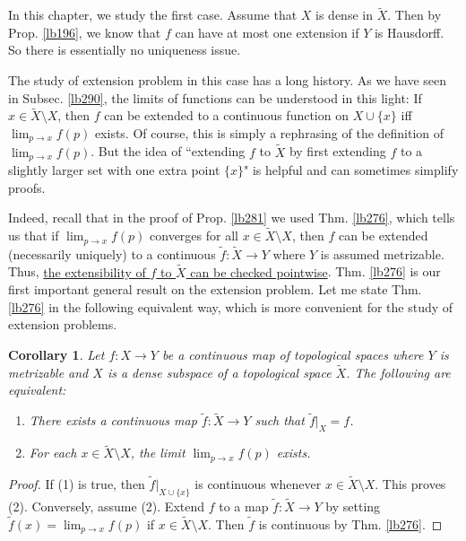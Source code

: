 \documentclass[12pt,b5paper,notitlepage]{article}
\theoremstyle{definition}
\theoremstyle{plain}
\newtheorem{co}[df]{Corollary}
\newcommand{\wtd}{\widetilde}
\numberwithin{equation}{section}
\begin{document}
In this chapter, we study the first case. Assume that $X$ is dense in $\wtd X$. Then by Prop. \ref{lb196}, we know that $f$ can have at most one extension if $Y$ is Hausdorff. So there is essentially no uniqueness issue. 


The study of extension problem in this case has a long history. As we have seen in Subsec. \ref{lb290}, the limits of functions can be understood in this light: If $x\in\wtd X\setminus X$, then $f$ can be extended to a continuous function on $X\cup\{x\}$ iff $\lim_{p\rightarrow x}f(p)$ exists. Of course, this is simply a rephrasing of the definition of $\lim_{p\rightarrow x}f(p)$. But the idea of ``extending $f$ to $\wtd X$ by first extending $f$ to a slightly larger set with one extra point $\{x\}$" is helpful and can sometimes simplify proofs.

Indeed, recall that in the proof of Prop. \ref{lb281} we used Thm. \ref{lb276}, which tells us that if $\lim_{p\rightarrow x}f(p)$ converges for all $x\in\wtd X\setminus X$, then $f$ can be extended (necessarily uniquely) to a continuous $\wtd f:\wtd X\rightarrow Y$ where $Y$ is assumed metrizable. Thus, \uline{the extensibility of $f$ to $\wtd X$ can be checked pointwise}. Thm. \ref{lb276} is our first important general result on the extension problem. Let me state Thm. \ref{lb276} in the following equivalent way, which is more convenient for the  study of extension problems.
\begin{co}\label{lb307}
Let $f:X\rightarrow Y$ be a continuous map of topological spaces where $Y$ is metrizable and $X$ is a dense subspace of a topological space $\wtd X$. The following are equivalent:
\begin{enumerate}[label=(\arabic*)]
\item There exists a continuous map $\wtd f:\wtd X\rightarrow Y$ such that $\wtd f|_X= f$.
\item For each $x\in\wtd X\setminus X$, the limit $\lim_{p\rightarrow x}f(p)$ exists.
\end{enumerate}
\end{co}

\begin{proof}
If (1) is true, then $\wtd f|_{X\cup\{x\}}$ is continuous whenever $x\in\wtd X\setminus X$. This proves (2). Conversely, assume (2). Extend $ f$ to a map $\wtd f:\wtd X\rightarrow Y$ by setting $\wtd f(x)=\lim_{p\rightarrow x}f(p)$ if $x\in\wtd X\setminus X$. Then $\wtd f$ is continuous by Thm. \ref{lb276}.
\end{proof}
\end{document}
